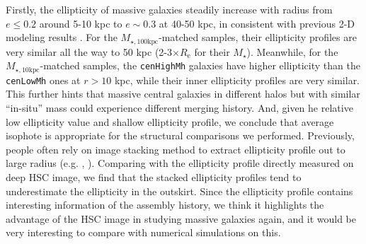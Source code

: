 \documentclass[a4paper,fleqn,usenatbib]{mnras}
\def\rbcg{\texttt{cenHighMh}}
\def\nbcg{\texttt{cenLowMh}}
\def\mstar{{$M_{\star}$}}
\def\minn{{$M_{\star,10\mathrm{kpc}}$}}
\def\mtot{{$M_{\star,100\mathrm{kpc}}$}}
\begin{document}
    Firstly, the ellipticity of massive galaxies steadily increase with radius 
    from $e\le 0.2$ around 5-10 kpc to $e\sim 0.3$ at 40-50 kpc, in consistent with 
    previous 2-D modeling results \citep{Huang2013a}.  
    For the \mtot{}-matched samples, their ellipticity profiles are very similar 
    all the way to 50 kpc (2-3$\times R_{\mathrm{e}}$ for their \mstar{}). 
    Meanwhile, for the \minn{}-matched samples, the \rbcg{} galaxies have higher 
    ellipticity than the \nbcg{} ones at $r > 10$ kpc, while their inner ellipticity 
    profiles are very similar.  
    This further hints that massive central galaxies in different halos but with 
    similar ``in-situ'' mass could experience different merging history.
    And, given he relative low ellipticity value and shallow ellipticity profile, 
    we conclude that average isophote is appropriate for the structural comparisons 
    we performed.
    Previously, people often rely on image stacking method to extract ellipticity 
    profile out to large radius (e.g. \citealt{Tal2011}, \citealt{DSouza2015}).
    Comparing with the ellipticity profile directly measured on deep HSC image, 
    we find that the stacked ellipticity profiles tend to underestimate the 
    ellipticity in the outskirt. 
    Since the ellipticity profile contains interesting information of the assembly 
    history, we think it highlights the advantage of the HSC image in studying 
    massive galaxies again, and it would be very interesting to compare with 
    numerical simulations on this.
     
    
\end{document}
